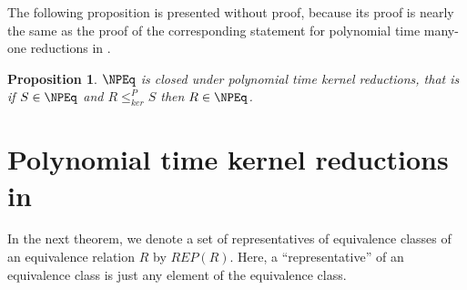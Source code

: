 \documentclass{article}
\newtheorem{proposition}[proposition]{Proposition}
\theoremstyle{definition} \newtheorem{definition}[definition]{Definition}
\newcommand{\kr}{\leq^{P}_{ker}} %
\newcommand{\defn}[1]{\emph{#1}} %
\begin{document}
The following proposition is presented without proof, because its proof is nearly the same as the proof of the corresponding statement for polynomial time many-one reductions in \NP.

\begin{proposition}\label{prop:closed_under_kr}
  $\NPEq$ is closed under polynomial time kernel reductions, that is if $S\in\NPEq$ and $R\kr S$ then $R\in\NPEq$.
\end{proposition}

\section{Polynomial time kernel reductions in \texorpdfstring{\PEq}{PEq}}

In the next theorem, we denote a set of representatives of equivalence classes of an equivalence relation $R$ by \defn{$REP(R)$}.
Here, a ``representative'' of an equivalence class is just any element of the equivalence class.
\end{document}
